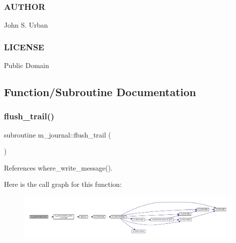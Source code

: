 \subsubsection*{A\+U\+T\+H\+OR}

John S. Urban \subsubsection*{L\+I\+C\+E\+N\+SE}

Public Domain 

\subsection{Function/\+Subroutine Documentation}
\mbox{\label{namespacem__journal_a24b891eded8ca585a6a72ab0eef7016c}} 
\subsubsection{\texorpdfstring{flush\+\_\+trail()}{flush\_trail()}}
{\footnotesize\ttfamily subroutine m\+\_\+journal\+::flush\+\_\+trail (\begin{DoxyParamCaption}{ }\end{DoxyParamCaption})\hspace{0.3cm}{\ttfamily [private]}}



References where\+\_\+write\+\_\+message().

Here is the call graph for this function\+:\nopagebreak
\begin{figure}[H]
\begin{center}
\leavevmode
\includegraphics[width=350pt]{namespacem__journal_a24b891eded8ca585a6a72ab0eef7016c_cgraph}
\end{center}
\end{figure}
\mbox{\label{namespacem__journal_a9c8074667748f2685122f2b3147e61d5}} 
